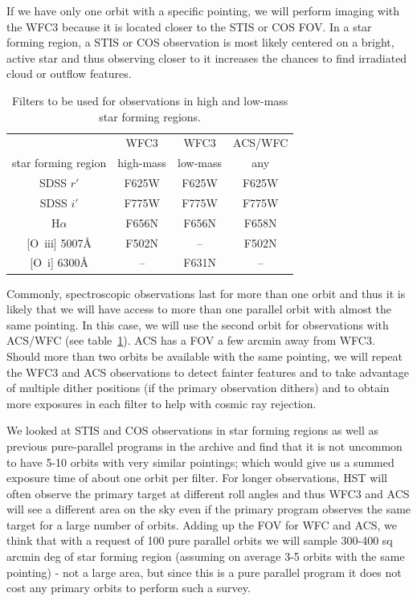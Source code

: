 \documentclass[12pt]{article}
\begin{document}
If we have only one orbit with a specific pointing, we will perform imaging with the WFC3 because it is located closer to the STIS or COS FOV. In a star forming region, a STIS or COS observation is most likely centered on a bright, active star and thus observing closer to it increases the chances to find irradiated cloud or outflow features. 

\begin{table}[htbp]
    \centering
    \begin{tabular}{c|ccc}
    \hline\hline
           & WFC3 & WFC3 & ACS/WFC \\
        star forming region & high-mass & low-mass & any\\
        \hline
        SDSS $r'$ & F625W & F625W & F625W \\
        SDSS $i'$ & F775W & F775W & F775W\\
        H$\alpha$ & F656N & F656N & F658N\\{}
        [O~{\sc iii}] 5007\AA{} & F502N & -- & F502N\\{}
        [O~{\sc i}] 6300\AA{}& -- & F631N & -- \\
        \hline
    \end{tabular}
    \caption{Filters to be used for observations in high and low-mass star forming regions.}
    \label{tab:setup}
\end{table}


Commonly, spectroscopic observations last for more than one orbit and thus it is likely that we will have access to more than one parallel orbit with almost the same pointing. In this case, we will use the second orbit for observations with ACS/WFC (see table~\ref{tab:setup}). ACS has a FOV a few arcmin away from WFC3. Should more than two orbits be available with the same pointing, we will repeat the WFC3 and ACS observations to detect fainter features and to take advantage of multiple dither positions (if the primary observation dithers) and to obtain more exposures in each filter to help with cosmic ray rejection. 

We looked at STIS and COS observations in star forming regions as well as previous pure-parallel programs in the archive and find that it is not uncommon to have 5-10 orbits with very similar pointings; which would give us a summed exposure time of about one orbit per filter. For longer observations, HST will often observe the primary target at different roll angles and thus WFC3 and ACS will see a different area on the sky even if the primary program observes the same target for a large number of orbits. Adding up the FOV for WFC and ACS, we think that with a request of 100 pure parallel orbits we will sample 300-400 sq arcmin deg of star forming region (assuming on average 3-5 orbits with the same pointing) - not a large area, but since this is a pure parallel program it does not cost any primary orbits to perform such a survey.
\end{document}
